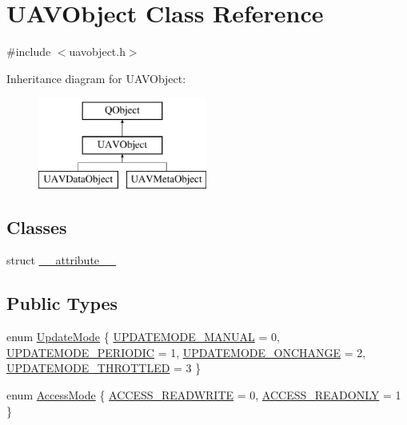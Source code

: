 \hypertarget{class_u_a_v_object}{\section{U\-A\-V\-Object Class Reference}
\label{class_u_a_v_object}
}


{\ttfamily \#include $<$uavobject.\-h$>$}

Inheritance diagram for U\-A\-V\-Object\-:\begin{figure}[H]
\begin{center}
\leavevmode
\includegraphics[height=3.000000cm]{class_u_a_v_object}
\end{center}
\end{figure}
\subsection*{Classes}
\begin{DoxyCompactItemize}
\item 
struct \hyperlink{struct_u_a_v_object_1_1____attribute____}{\-\_\-\-\_\-attribute\-\_\-\-\_\-}
\end{DoxyCompactItemize}
\subsection*{Public Types}
\begin{DoxyCompactItemize}
\item 
enum \hyperlink{group___u_a_v_objects_plugin_ga08c0580992fcd51c2b44734e2d24cac6}{Update\-Mode} \{ \hyperlink{group___u_a_v_objects_plugin_gga08c0580992fcd51c2b44734e2d24cac6a7e761571cc6ee4432fa664f23fcb7032}{U\-P\-D\-A\-T\-E\-M\-O\-D\-E\-\_\-\-M\-A\-N\-U\-A\-L} = 0, 
\hyperlink{group___u_a_v_objects_plugin_gga08c0580992fcd51c2b44734e2d24cac6a6057e8a8af67f00940fad6f62499b843}{U\-P\-D\-A\-T\-E\-M\-O\-D\-E\-\_\-\-P\-E\-R\-I\-O\-D\-I\-C} = 1, 
\hyperlink{group___u_a_v_objects_plugin_gga08c0580992fcd51c2b44734e2d24cac6a118268aa016a1f371149d6180bd9a366}{U\-P\-D\-A\-T\-E\-M\-O\-D\-E\-\_\-\-O\-N\-C\-H\-A\-N\-G\-E} = 2, 
\hyperlink{group___u_a_v_objects_plugin_gga08c0580992fcd51c2b44734e2d24cac6aea4380a186f544bd364259d2e436fb75}{U\-P\-D\-A\-T\-E\-M\-O\-D\-E\-\_\-\-T\-H\-R\-O\-T\-T\-L\-E\-D} = 3
 \}
\item 
enum \hyperlink{group___u_a_v_objects_plugin_ga80357a2f38fa4be23200de86614c3d77}{Access\-Mode} \{ \hyperlink{group___u_a_v_objects_plugin_gga80357a2f38fa4be23200de86614c3d77ad710c074e7e275da805bf900c9917d47}{A\-C\-C\-E\-S\-S\-\_\-\-R\-E\-A\-D\-W\-R\-I\-T\-E} = 0, 
\hyperlink{group___u_a_v_objects_plugin_gga80357a2f38fa4be23200de86614c3d77a97e59f527995175cc60e103001470e49}{A\-C\-C\-E\-S\-S\-\_\-\-R\-E\-A\-D\-O\-N\-L\-Y} = 1
 \}
\end{DoxyCompactItemize}
